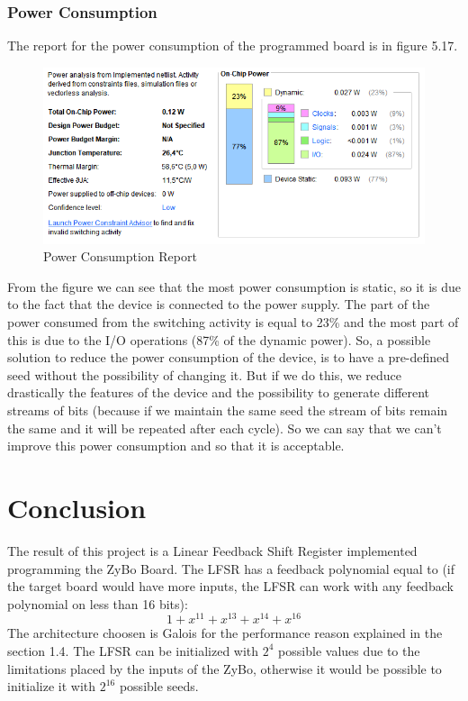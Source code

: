 \documentclass[a4paper]{report}
\begin{document}
\subsection{Power Consumption}
The report for the power consumption of the programmed board is in figure 5.17.
\begin{figure}[htpb]
	\centering
	\includegraphics[scale=0.85]{img/vivado/power.png}
	\caption{Power Consumption Report}
\end{figure}

\noindent From the figure we can see that the most power consumption is static, so it is due to the fact that the device is connected to the power supply. The part of the power consumed from the switching activity is equal to 23\% and the most part of this is due to the I/O operations (87\% of the dynamic power). So, a possible solution to reduce the power consumption of the device, is to have a pre-defined seed without the possibility of changing it. But if we do this, we reduce drastically the features of the device and the possibility to generate different streams of bits (because if we maintain the same seed the stream of bits remain the same and it will be repeated after each cycle). So we can say that we can't improve this power consumption and so that it is acceptable.
 
\chapter{Conclusion}
The result of this project is a Linear Feedback Shift Register implemented programming the ZyBo Board. The LFSR has a feedback polynomial equal to (if the target board would have more inputs, the LFSR can work with any feedback polynomial on less than 16 bits):
\[1+x^{11}+x^{13}+x^{14}+x^{16}\]
The architecture choosen is Galois for the performance reason explained in the section 1.4.
The LFSR can be initialized with $2^4$ possible values due to the limitations placed by the inputs of the ZyBo, otherwise it would be possible to initialize it with $2^{16}$ possible seeds.
\end{document}

